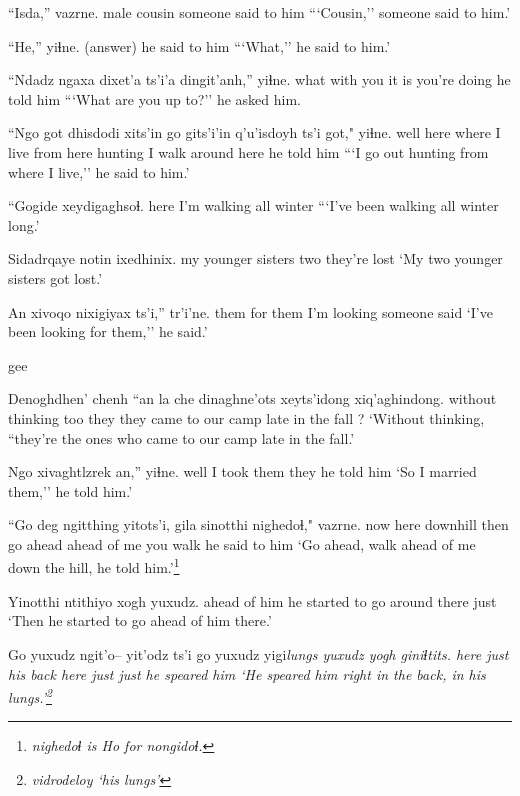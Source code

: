 \documentclass[12pt]{article}
\begin{document}
\gll ``Isda,'' vazrne.
{male cousin}  {someone said to him}
\glt ```Cousin,'' someone said to him.'
\glend

\gll ``He,'' yiɬne.
(answer)   {he said to him}
\glt ```What,'' he said to him.'
\glend

\gll ``Ndadz ngaxa dixet'a ts'i'a dingit'anh,'' yiɬne.
what  {with you}    {it is}  {}        {you're doing} {he told him}
\glt ```What are you up to?'' he asked him.
\glend

\gll ``Ngo  got  dhisdodi xits'in go   gits'i'in q'u'isdoyh ts'i got,"  yiɬne.
 well here {where I live} from    here hunting   {I walk around}  {}          here {he told him}
\glt ```I go out hunting from where I live,'' he said to him.'
\glend

\gll ``Gogide xeydigaghsoɬ.
 here  {I'm walking all winter}
\glt ```I've been walking all winter long.'
\glend

\gll Sidadrqaye         notin ixedhinix.
{my younger sisters} two   {they're lost}
\glt `My two younger sisters got lost.'
\glend

\gll An   xivoqo   nixigiyax   ts'i,'' tr'i'ne.
them {for them} {I'm looking}  {}      {someone said}
\glt `I've been looking for them,'' he said.'
\glend

gee

\gll Denoghdhen'   chenh ``an   {la che} dinaghne'ots             xeyts'idong      xiq'aghindong.
{without thinking} too  they  {}      {they came to our camp}  {late in the fall} ?
\glt `Without thinking, ``they're the ones who came to our camp late in the fall.'
\glend

\gll Ngo  xivaghtlzrek an,''   yiɬne.
well {I took them}  they {he told him}
\glt `So I married them,'' he told him.'
\glend

\gll ``Go  deg  ngitthing yitots'i, gila     sinotthi    nighedoɬ," vazrne.
 now here downhill  then     {go ahead} {ahead of me} {you walk}  {he said to him}
\glt `Go ahead, walk ahead of me down the hill, he told him.'\footnote{\em nighedoɬ \em is Ho for \em nongidoɬ.}
\glend

\gll Yinotthi     ntithiyo         xogh yuxudz.
{ahead of him} {he started to go} {around there} just
\glt `Then he started to go ahead of him there.'
\glend

\gll Go   yuxudz ngit'o-- yit'odz  ts'i go   yuxudz yigi\em{lungs} yuxudz {yogh giniɬtits}.
here just   {}         {his back}  {}    here just     {}        just   {he speared him}
\glt `He speared him right in the back, in his lungs.'\footnote{\em vidrodeloy \em `his lungs'}
\glend 
\end{document}

